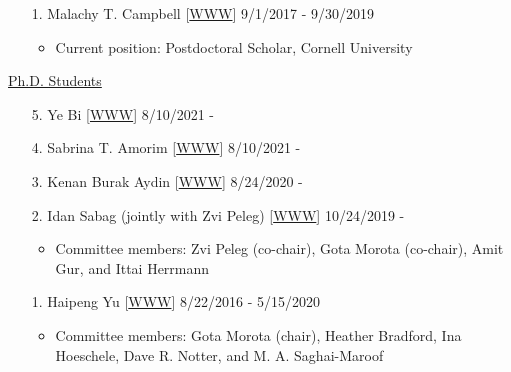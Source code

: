 \documentclass[margin,line,10pt]{res}
\begin{document}
\begin{resume}
\begin{enumerate}
  \vspace{0.3cm}
  
\item [1.] Malachy T. Campbell  [\textcolor{blue}{\href{https://malachycampbell.github.io/}{WWW}}]  \hfill  9/1/2017 - 9/30/2019
  \begin{itemize} 
  \item Current position: Postdoctoral Scholar, Cornell University 
  \end{itemize}
\end{enumerate}



\begin{flushleft}
\hspace{0.2cm} \underline{Ph.D. Students}
\end{flushleft}
\begin{enumerate}


  \item [5.] Ye Bi [\textcolor{blue}{\href{https://yebi.netlify.app/}{WWW}}]  \hfill  8/10/2021 -

    \vspace{0.3cm}
    
   \item [4.] Sabrina T. Amorim [\textcolor{blue}{\href{https://sabrinaam.github.io/}{WWW}}]  \hfill  8/10/2021 -

     \vspace{0.3cm}
     
  \item [3.] Kenan Burak Aydin [\textcolor{blue}{\href{}{WWW}}]  \hfill  8/24/2020 -

    \vspace{0.3cm}

    
  \item [2.] Idan Sabag (jointly with Zvi Peleg) [\textcolor{blue}{\href{https://twitter.com/idansabag7}{WWW}}]  \hfill  10/24/2019 -

    \begin{itemize}
     \item  Committee members: Zvi Peleg (co-chair), Gota Morota (co-chair), Amit Gur, and Ittai Herrmann 
    \end{itemize}
    
    \vspace{0.3cm}

  \item [1.] Haipeng Yu [\textcolor{blue}{\href{https://haipengu.github.io/}{WWW}}]  \hfill 8/22/2016 - 5/15/2020
    \begin{itemize}
     \item  Committee members: Gota Morota (chair), Heather Bradford, Ina Hoeschele, Dave R. Notter, and M. A. Saghai-Maroof
    \end{itemize}
\end{enumerate}









\end{resume}
\end{document}
